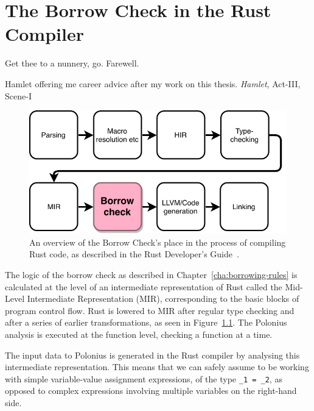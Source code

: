 \documentclass[11pt,a4paper,twoside,openany,draft]{report}
\newcommand{\InRust}[1]{\texttt{#1}}
\begin{document}
\chapter{The Borrow Check in the Rust Compiler}\label{cha:borrow-check-compiler}
\epigraph{Get thee to a nunnery, go. Farewell.}%
{Hamlet offering me career advice after my work on this thesis. \textit{Hamlet},
  Act-III, Scene-I}

\begin{figure}[h!]
  \includegraphics[width=0.9\linewidth]{Graphs/rustc-overview}
  \caption[The Rust Compilation Process]{An overview of the Borrow Check's place
    in the process of compiling Rust code, as described in the Rust Developer's
    Guide~\cite{rustc_developers_guide_nodate}.}\label{fig:rustc-overview}
\end{figure}

The logic of the borrow check as described in Chapter~\ref{cha:borrowing-rules}
is calculated at the level of an intermediate representation of Rust called the
Mid-Level Intermediate Representation (MIR), corresponding to the basic blocks
of program control flow. Rust is lowered to MIR after regular type checking and
after a series of earlier transformations, as seen in
Figure~\ref{fig:rustc-overview}. The Polonius analysis is executed at the
function level, checking a function at a time.

The input data to Polonius is generated in the Rust compiler by analysing this
intermediate representation. This means that we can safely assume to be working
with simple variable-value assignment expressions, of the type \InRust{_1 = _2},
as opposed to complex expressions involving multiple variables on the right-hand
side.
\end{document}
